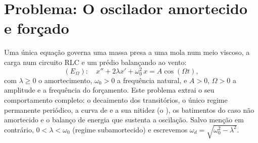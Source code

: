 \section{Problema: O oscilador amortecido e forçado}

\begin{problem}\label{pb:b1:diffeq:1}
Uma única equação governa uma massa presa a uma mola num meio
viscoso, a carga num circuito RLC e um prédio balançando ao vento:
\[
(E_\Omega)\colon\quad
x'' + 2\lambda x' + \omega_0^2\,x = A\cos(\Omega t),
\]
com $\lambda \geq 0$ o amortecimento, $\omega_0 > 0$ a frequência
natural, e $A > 0$, $\Omega > 0$ a amplitude e a frequência do
forçamento. Este problema extrai o seu comportamento completo: o
decaimento dos transitórios, o único regime permanente periódico, a
curva de  e a sua nitidez (o \emph{}), os
batimentos do caso não amortecido e o balanço de energia que sustenta a
oscilação.
Salvo menção em contrário, $0 < \lambda < \omega_0$ (regime
subamortecido) e escrevemos $\omega_d = \sqrt{\omega_0^2 - \lambda^2}$.


\end{problem}
